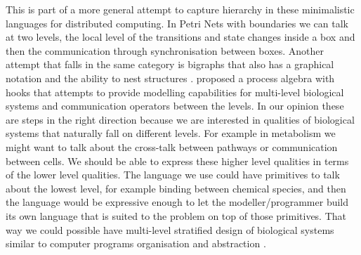 This is part of a more general attempt to capture hierarchy in
these minimalistic languages for distributed computing. In Petri Nets
with boundaries we can talk at two levels, the local level of the
transitions and state changes inside a box and then the communication
through synchronisation between boxes. Another attempt that falls in
the same category is bigraphs that also has a graphical notation and
the ability to nest structures \cite []
{jensen2004bigraphs}. \citet{degasperi2013process} proposed a process
algebra with hooks that attempts to provide modelling capabilities for
multi-level biological systems and communication operators between the
levels. In our opinion these are steps in the right direction because we
are interested in qualities of biological systems that naturally fall
on different levels. For example in metabolism we might want to talk
about the cross-talk between pathways or communication between cells. We should be able to express these higher level
qualities in terms of the lower level qualities. The language we use
could have primitives to talk about the lowest level, for example
binding between chemical species, and then the language would be
expressive enough to let the modeller/programmer build its own
language that is suited to the problem on top of those primitives.
That way we could
possible have multi-level stratified design of biological systems similar
to computer programs organisation and abstraction \cite [] {abelson1987lisp}.

